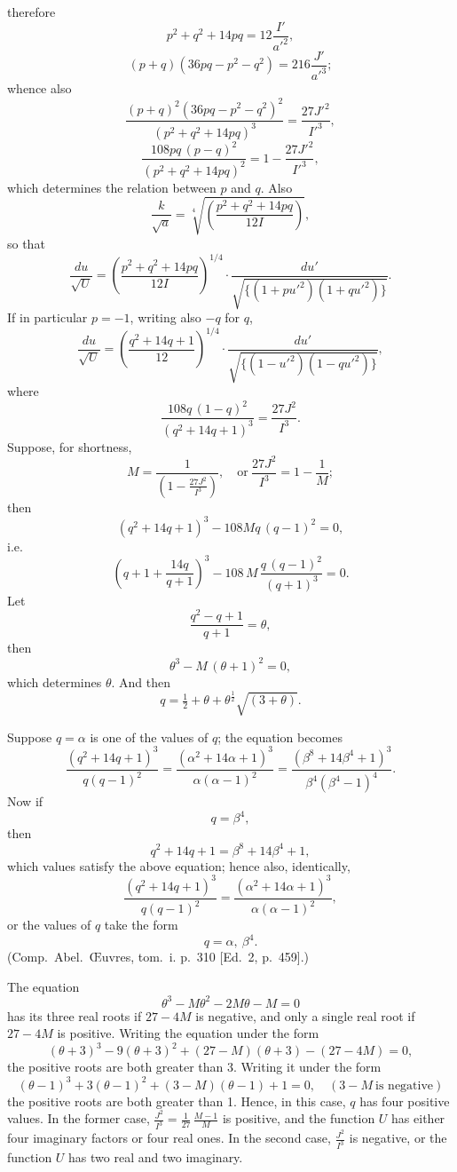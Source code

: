 \documentclass[11pt]{article}
\begin{document}
therefore
\[
p^2 + q^2 + 14 pq = 12 \frac{I'}{a'^2},
\]
\[
(p + q)(36 pq - p^2 - q^2) = 216 \frac{J'}{a'^3};
\]
whence also
\[
\frac{(p+q)^2 (36pq - p^2 - q^2)^2}{(p^2 + q^2 + 14 pq)^3} = \frac{27 J'^2}{I'^3},
\]
\[
\frac{108 pq\,(p-q)^2}{(p^2 + q^2 + 14 pq)^2} = 1 - \frac{27 J'^2}{I'^3},
\]
which determines the relation between $p$ and $q$. Also
\[
\frac{k}{\sqrt{a}} = \sqrt[4]{\left( \frac{p^2 + q^2 + 14 pq}{12 I}\right)},
\]
so that
\[
\frac{du}{\sqrt{U}} = \left(\frac{p^2 + q^2 + 14 pq}{12 I}\right)^{\!1/4} \cdot \frac{du'}{\sqrt{\{(1 + pu'^2)(1 + qu'^2)\}}}.
\]
If in particular $p = -1$, writing also $-q$ for $q$,
\[
\frac{du}{\sqrt{U}} = \left(\frac{q^2 + 14q + 1}{12}\right)^{\!1/4} \cdot \frac{du'}{\sqrt{\{(1 - u'^2)(1 - qu'^2)\}}},
\]
where
\[
\frac{108 q\,(1 - q)^2}{(q^2 + 14q + 1)^3} = \frac{27 J^2}{I^3}.
\]
Suppose, for shortness,
\[
M = \frac{1}{(1 - \frac{27 J^2}{I^3})},\quad \text{or}\ \frac{27 J^2}{I^3} = 1 - \frac{1}{M};
\]
then
\[
(q^2 + 14 q + 1)^3 - 108 M q\,(q - 1)^2 = 0,
\]
i.e.
\[
\left(q + 1 + \frac{14 q}{q + 1}\right)^{\!3} - 108\,M\,\frac{q\,(q - 1)^2}{(q + 1)^3} = 0.
\]
Let
\[
\frac{q^2 - q + 1}{q + 1} = \theta,
\]
then
\[
\theta^3 - M\,(\theta + 1)^2 = 0,
\]
which determines $\theta$. And then
\[
q = \tfrac12 + \theta + \theta^{\frac12}\sqrt{(3 + \theta)}.
\]

\newpage
\setcounter{page}{227}

Suppose $q = \alpha$ is one of the values of $q$; the equation becomes
\[
\frac{(q^2 + 14 q + 1)^3}{q(q - 1)^2} = \frac{(\alpha^2 + 14 \alpha + 1)^3}{\alpha(\alpha - 1)^2} = \frac{(\beta^8 + 14\beta^4 + 1)^3}{\beta^4(\beta^4 - 1)^4}.
\]
Now if
\[
q = \beta^4,
\]
then
\[
q^2 + 14 q + 1 = \beta^8 + 14 \beta^4 + 1,
\]
which values satisfy the above equation; hence also, identically,
\[
\frac{(q^2 + 14 q + 1)^3}{q(q - 1)^2} = \frac{(\alpha^2 + 14 \alpha + 1)^3}{\alpha(\alpha - 1)^2},
\]
or the values of $q$ take the form
\[
q = \alpha,\ \beta^4.
\]
(Comp.~Abel.~\OE{}uvres, tom.~i. p.~310 [Ed.~2, p.~459].)

The equation
\[
\theta^3 - M\theta^2 - 2 M\theta - M = 0
\]
has its three real roots if $27 - 4 M$ is negative, and only a single real root if $27 - 4M$ is positive. Writing the equation under the form
\[
(\theta + 3)^3 - 9(\theta + 3)^2 + (27 - M)(\theta + 3) - (27 - 4M) = 0,
\]
the positive roots are both greater than 3. Writing it under the form
\[
(\theta - 1)^3 + 3(\theta - 1)^2 + (3 - M)(\theta - 1) + 1 = 0,\quad (3 - M\ \text{is negative})
\]
the positive roots are both greater than 1. Hence, in this case, $q$ has four positive values. In the former case, $\frac{J^2}{I^3} = \frac{1}{27}\,\frac{M-1}{M}$ is positive, and the function $U$ has either four imaginary factors or four real ones. In the second case, $\frac{J^2}{I^3}$ is negative, or the function $U$ has two real and two imaginary.
\end{document}
